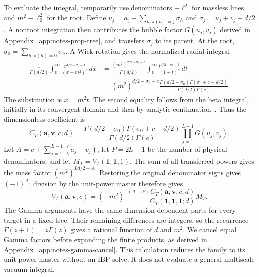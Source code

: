 To evaluate the integral, temporarily use denominators $-\ell^2$ for massless lines and $m^2-\ell_0^2$ for the root. Define $u_j=a_j+\sum_{h:\pi(h)=j}\sigma_h$ and $\sigma_j=u_j+v_j-d/2$. A nonroot integration then contributes the bubble factor $G(u_j,v_j)$ derived in Appendix~\ref{app:notes-prop-tree}, and transfers $\sigma_j$ to its parent. At the root, $\sigma_0=\sum_{h:\pi(h)=0}\sigma_h$. A Wick rotation gives the normalized radial integral
\begin{align}
 \frac{1}{\Gamma(d/2)}\int_0^\infty
 \frac{x^{d/2-\sigma_0-1}}{(x+m^2)^c}\,dx
 &=\frac{(m^2)^{d/2-\sigma_0-c}}{\Gamma(d/2)}
 \int_0^\infty\frac{t^{d/2-\sigma_0-1}}{(1+t)^c}\,dt \nonumber\\
 &=(m^2)^{d/2-\sigma_0-c}
 \frac{\Gamma(d/2-\sigma_0)\Gamma(\sigma_0+c-d/2)}
 {\Gamma(d/2)\Gamma(c)} .
 \label{eq:notes-vac-ml-radial}
\end{align}
The substitution is $x=m^2t$. The second equality follows from the beta integral, initially in its convergent domain and then by analytic continuation~\cite{Weinzierl2022}. Thus the dimensionless coefficient is
\begin{equation}
 C_T(\mathbf a,\mathbf v,c;d)=
 \frac{\Gamma(d/2-\sigma_0)\Gamma(\sigma_0+c-d/2)}{\Gamma(d/2)\Gamma(c)}
 \prod_{j=1}^{L-1}G(u_j,v_j).
 \label{eq:notes-vac-ml-gamma}
\end{equation}
Let $A=c+\sum_{j=1}^{L-1}(a_j+v_j)$, let $P=2L-1$ be the number of physical denominators, and let $M_T=V_T(\mathbf1,\mathbf1,1)$. The sum of all transferred powers gives the mass factor $(m^2)^{Ld/2-A}$. Restoring the original denominator signs gives $(-1)^A$; division by the unit-power master therefore gives
\begin{equation}
 V_T(\mathbf a,\mathbf v,c)=
 (-m^2)^{-(A-P)}
 \frac{C_T(\mathbf a,\mathbf v,c;d)}{C_T(\mathbf1,\mathbf1,1;d)}M_T.
 \label{eq:notes-vac-ml-ratio}
\end{equation}
The Gamma arguments have the same dimension-dependent parts for every target in a fixed tree. Their remaining differences are integers, so the recurrence $\Gamma(z+1)=z\Gamma(z)$ gives a rational function of $d$ and $m^2$. We cancel equal Gamma factors before expanding the finite products, as derived in Appendix~\ref{app:notes-gamma-cancel}. This calculation reduces the family to its unit-power master without an IBP solve. It does not evaluate a general multiscale vacuum integral.

